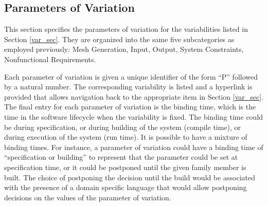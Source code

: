 \documentclass[12pt, notitlepage]{article}
\begin{document}
\subsection{Parameters of Variation}
This section specifies the parameters of variation for the variabilities listed in Section \ref{var_sec}. They are organized into the same five subcategories as employed previously: Mesh Generation, Input, Output, System Constraints, Nonfunctional Requirements. 

Each parameter of variation is given a unique identifier of the form “P” followed by a natural number. The corresponding variability is listed and a hyperlink is provided that allows navigation back to the appropriate item in Section \ref{var_sec}. The final entry for each parameter of variation is the binding time, which is the time in the software lifecycle when the variability is fixed. The binding time could be during specification, or during building
of the system (compile time), or during execution of the system (run time). It is possible to have a mixture of binding times. For instance, a parameter of variation could have a binding time of “specification or building” to represent that the parameter could be set at specification time, or it could be postponed until the given family member is built. The choice of postponing the decision until the build would be associated with the presence of a domain specific language that would allow postponing decisions on the values of the parameter of variation.
\end{document}
